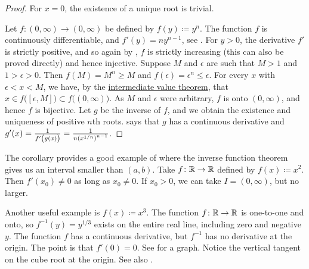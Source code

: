\begin{proof}
For $x=0$, the existence of a unique root is trivial.

Let $f \colon (0,\infty) \to (0,\infty)$ be defined by $f(y) \coloneqq y^n$.
The function $f$ is continuously differentiable,
and $f'(y) = ny^{n-1}$, see .
For $y > 0$, the derivative $f'$ is strictly positive,
and so again by , $f$ is strictly
increasing (this can also be proved directly) and hence injective.
Suppose $M$ and $\epsilon$ are such that
$M > 1$ and $1 > \epsilon > 0$.
Then
$f(M) = M^n \geq M$ and
$f(\epsilon) = \epsilon^n \leq \epsilon$.
For every $x$ with $\epsilon < x < M$,
we have, by the
\hyperref[IVT:thm]{intermediate value theorem}, that $x \in
f\bigl( [\epsilon,M] \bigr) \subset
f\bigl( (0,\infty) \bigr)$.  As $M$ and $\epsilon$ were arbitrary, $f$ is onto
$(0,\infty)$, and hence $f$ is bijective.
Let $g$ be the inverse of $f$, and we obtain
the existence and uniqueness of positive
$n$th roots.   says that $g$ has a continuous
derivative and $g'(x) =
\frac{1}{f'\left(\vphantom{1^1_1}g(x)\right)} = \frac{1}{n {(x^{1/n})}^{n-1}}$.
\end{proof}

\begin{example}
The corollary provides a good example of where the inverse function theorem
gives us an interval smaller than $(a,b)$.  Take $f \colon {\mathbb{R}} \to {\mathbb{R}}$
defined by $f(x) \coloneqq x^2$.  Then $f'(x_0) \neq 0$
as long as $x_0 \neq 0$.  If $x_0 > 0$, we can take $I=(0,\infty)$, but
no larger.
\end{example}

\begin{example}
Another useful example is $f(x) \coloneqq x^3$.  The function $f \colon {\mathbb{R}} \to {\mathbb{R}}$ is
one-to-one and onto, so $f^{-1}(y) = y^{1/3}$ exists on the entire real
line, including zero and negative $y$.  The function $f$ has
a continuous derivative, but $f^{-1}$ has no derivative at the origin.  The
point is that $f'(0) = 0$.  See  for a graph.
Notice the vertical tangent on the cube root at the origin.
See also .
\begin{myfigureht}
\caption{Graphs of $x^3$ and $x^{1/3}$.\label{cubecuberootfig}}
\end{myfigureht}
\end{example}


